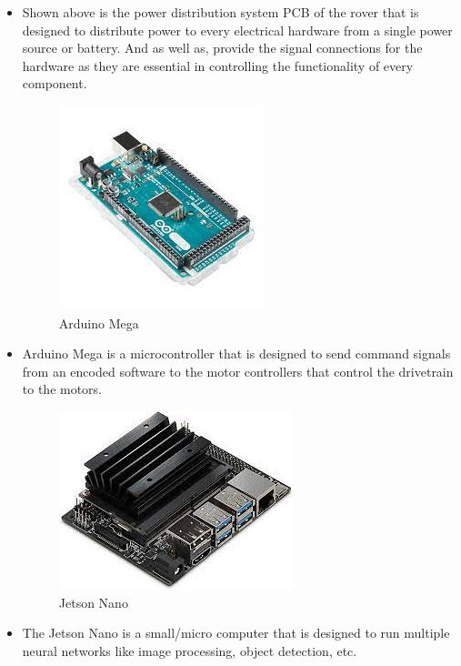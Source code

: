 \documentclass[a4paper, 10pt]{article}
\begin{document}
		\begin{itemize}
		\item Shown above is the power distribution system PCB of the rover that is designed to distribute power to every electrical hardware from a single power source or battery. And as well as, provide the signal connections for the hardware as they are essential in controlling the functionality of every component. 

		\begin{figure} [h]
			\centering
			\includegraphics[scale=0.5]{Photos/Arduino Mega}
			\caption{Arduino Mega}
		\end{figure}

		\item Arduino Mega is a microcontroller that is designed to send command signals from an encoded software to the motor controllers that control the drivetrain to the motors.

		\begin{figure} [!h]
			\centering
			\includegraphics[scale=0.35]{Photos/Jetson Nano}
			\caption{Jetson Nano}
		\end{figure}

		\item The Jetson Nano is a small/micro computer that is designed to run multiple neural networks like image processing, object detection, etc. 


\end{itemize}
\end{document}
